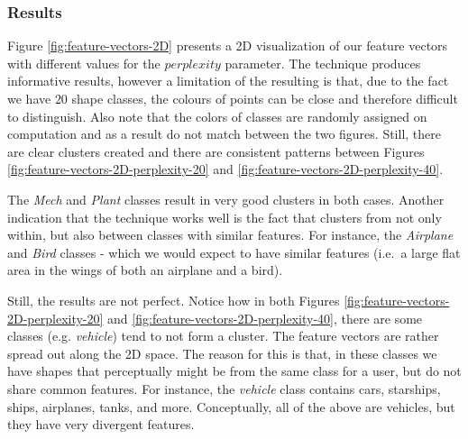 \subsubsection{Results}
Figure \ref{fig:feature-vectors-2D} presents a 2D visualization of our feature vectors with different values for the $perplexity$ parameter.
The technique produces informative results, however a limitation of the resulting is that, due to the fact we have $20$ shape classes, the colours of points can be close and therefore difficult to distinguish.
Also note that the colors of classes are randomly assigned on computation and as a result do not match between the two figures.
Still, there are clear clusters created and there are consistent patterns between Figures \ref{fig:feature-vectors-2D-perplexity-20} and \ref{fig:feature-vectors-2D-perplexity-40}.


The \textit{Mech} and \textit{Plant} classes result in very good clusters in both cases.
Another indication that the technique works well is the fact that clusters from not only within, but also between classes with similar features.
For instance, the \textit{Airplane} and \textit{Bird} classes - which we would expect to have similar features (i.e.\ a large flat area in the wings of both an airplane and a bird).

Still, the results are not perfect.
Notice how in both Figures \ref{fig:feature-vectors-2D-perplexity-20} and \ref{fig:feature-vectors-2D-perplexity-40}, there are some classes (e.g. \textit{vehicle}) tend to not form a cluster.
The feature vectors are rather spread out along the 2D space.
The reason for this is that, in these classes we have shapes that perceptually might be from the same class for a user, but do not share common features.
For instance, the \textit{vehicle} class contains cars, starships, ships, airplanes, tanks, and more.
Conceptually, all of the above are vehicles, but they have very divergent features.

